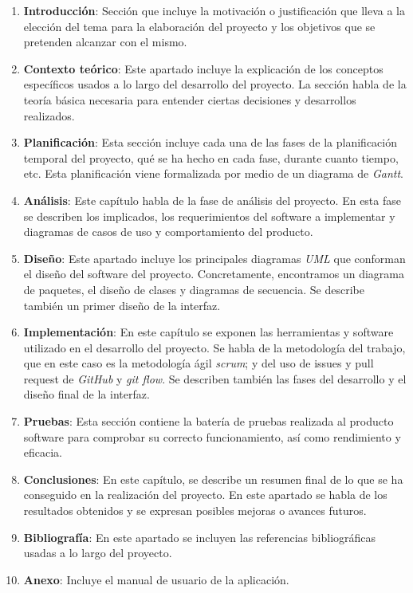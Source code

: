 \begin{enumerate}
	\item \textbf{Introducción}:
	Sección que incluye la motivación o justificación que lleva a la elección del tema para la elaboración del proyecto y los objetivos que se pretenden alcanzar con el mismo. 
	\item \textbf{Contexto teórico}:
	Este apartado incluye la explicación de los conceptos específicos usados a lo largo del desarrollo del proyecto. La sección habla de la teoría básica necesaria para entender ciertas decisiones y desarrollos realizados.
	\item \textbf{Planificación}: 
	Esta sección incluye cada una de las fases de la planificación temporal del proyecto, qué se ha hecho en cada fase, durante cuanto tiempo, etc. Esta planificación viene formalizada por medio de un diagrama de \textit{Gantt}. %
	\item \textbf{Análisis}: 
	Este capítulo habla de la fase de análisis del proyecto. En esta fase se describen los implicados, los requerimientos del software a implementar y diagramas de casos de uso y comportamiento del producto.
	\item \textbf{Diseño}: 
	Este apartado incluye los principales diagramas \textit{UML} que conforman el diseño del software del proyecto. Concretamente, encontramos un diagrama de paquetes, el diseño de clases y diagramas de secuencia. Se describe también un primer diseño de la interfaz.
	\item \textbf{Implementación}: 
	En este capítulo se exponen las herramientas y software utilizado en el desarrollo del proyecto. Se habla de la metodología del trabajo, que en este caso es la metodología ágil \textit{scrum}; y del uso de issues y pull request de \textit{GitHub} y \textit{git flow}. Se describen también las fases del desarrollo y el diseño final de la interfaz.
	\item \textbf{Pruebas}: 
	Esta sección contiene la batería de pruebas realizada al producto software para comprobar su correcto funcionamiento, así como rendimiento y eficacia.
	\item \textbf{Conclusiones}: 
	En este capítulo, se describe un resumen final de lo que se ha conseguido en la realización del proyecto. En este apartado se habla de los resultados obtenidos y se expresan posibles mejoras o avances futuros.
	\item \textbf{Bibliografía}: 
	En este apartado se incluyen las referencias bibliográficas usadas a lo largo del proyecto.
	\item \textbf{Anexo}: 
	Incluye el manual de usuario de la aplicación.
\end{enumerate}